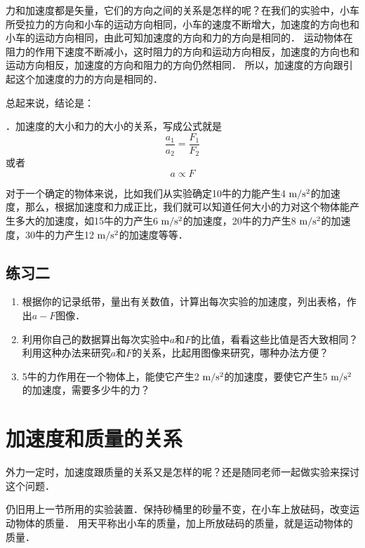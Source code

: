 力和加速度都是矢量，它们的方向之间的关系是怎样的呢？在我们的实验中，小车所受拉力的方向和小车的运动方向相同，小车的速度不断增大，加速度的方向也和小车的运动方向相同，由此可知加速度的方向和力的方向是相同的．
运动物体在阻力的作用下速度不断减小，这时阻力的方向和运动方向相反，加速度的方向也和运动方向相反，加速度的方向和阻力的方向仍然相同．
所以，加速度的方向跟引起这个加速度的力的方向是相同的．

总起来说，结论是：

．加速度的大小和力的大小的关系，写成公式就是
\[\frac{a_1}{a_2}=\frac{F_1}{F_2} \]
或者
\[a\propto F\]

对于一个确定的物体来说，比如我们从实验确定10牛的力能产生4$\;\text{m}/\text{s}^2$的加速度，那么，根据加速度和力成正比，我们就可以知道任何大小的力对这个物体能产生多大的加速度，如15牛的力产生6$\;\text{m}/\text{s}^2$的加速度，20牛的力产生8$\;\text{m}/\text{s}^2$的加速度，30牛的力产生12$\;\text{m}/\text{s}^2$的加速度等等．

\subsection*{练习二}
\begin{enumerate}
    \item 根据你的记录纸带，量出有关数值，计算出每次实验的加速度，列出表格，作出$a-F$图像．
    \item 利用你自己的数据算出每次实验中$a$和$F$的比值，看看这些比值是否大致相同？利用这种办法来研究$a$和$F$的关系，比起用图像来研究，哪种办法方便？
    \item 5牛的力作用在一个物体上，能使它产生2$\;\text{m}/\text{s}^2$的加速度，要使它产生5$\;\text{m}/\text{s}^2$的加速度，需要多少牛的力？
\end{enumerate}


\section{加速度和质量的关系}\label{sec-A-3-relationship-between-acceleration-and-mass}
外力一定时，加速度跟质量的关系又是怎样的呢？还是随同老师一起做实验来探讨这个问题．

仍旧用上一节所用的实验装置．保持砂桶里的砂量不变，在小车上放砝码，改变运动物体的质量．
用天平称出小车的质量，加上所放砝码的质量，就是运动物体的质量．

